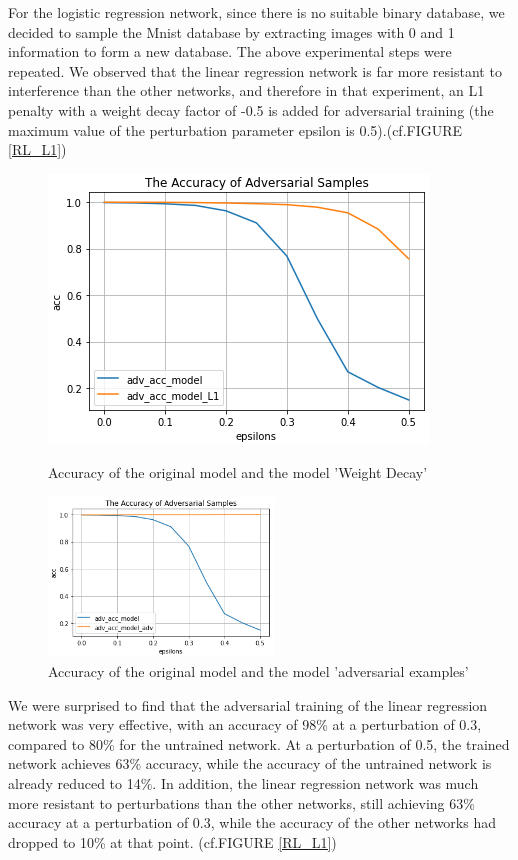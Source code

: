 For the logistic regression network, since there is no suitable binary database, we decided to sample the Mnist database by extracting images with 0 and 1 information to form a new database. The above experimental steps were repeated. We observed that the linear regression network is far more resistant to interference than the other networks, and therefore in that experiment, an L1 penalty with a weight decay factor of -0.5 is added for adversarial training (the maximum value of the perturbation parameter epsilon is 0.5).(cf.FIGURE \ref{RL_L1})
\begin{figure}[htb]
\centering
\begin{minipage}[t]{0.48\textwidth}
\centering
\includegraphics[width=6 cm]{Acc of RL l1.png}
\caption{Accuracy of the original model and the model 'Weight Decay'}
\label{RL_L1}
\end{minipage}
\begin{minipage}[t]{0.48\textwidth}
\centering
\includegraphics[width=6cm]{Acc of RL adv.png}
\caption{Accuracy of the original model and the model 'adversarial examples'}
\label{RL_adv}
\end{minipage}
\end{figure}
We were surprised to find that the adversarial training of the linear regression network was very effective, with an accuracy of 98\% at a perturbation of 0.3, compared to 80\% for the untrained network. At a perturbation of 0.5, the trained network achieves 63\% accuracy, while the accuracy of the untrained network is already reduced to 14\%. In addition, the linear regression network was much more resistant to perturbations than the other networks, still achieving 63\% accuracy at a perturbation of 0.3, while the accuracy of the other networks had dropped to 10\% at that point. (cf.FIGURE \ref{RL_L1})
